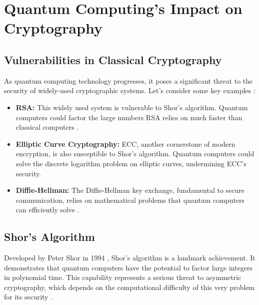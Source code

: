 \chapter{Quantum Computing's Impact on Cryptography}\label{chap:quantum_impact}

\section{Vulnerabilities in Classical Cryptography}

As quantum computing technology progresses, it poses a significant threat to the security of widely-used cryptographic systems.  Let's consider some key examples \parencite{shor1997polynomial,mosca2018cybersecurity}:

\begin{itemize}
    \item \textbf{RSA:}  This widely used system is vulnerable to Shor's algorithm. Quantum computers could factor the large numbers RSA relies on much faster than classical computers \parencite{rivest1978method}.
    \item \textbf{Elliptic Curve Cryptography:}  ECC, another cornerstone of modern encryption, is also susceptible to Shor's algorithm. Quantum computers could solve the discrete logarithm problem on elliptic curves, undermining ECC's security.
    \item \textbf{Diffie-Hellman:} The Diffie-Hellman key exchange, fundamental to secure communication, relies on mathematical problems that quantum computers can efficiently solve \parencite{diffie1976new}.
\end{itemize}


\section{Shor's Algorithm}\label{sec:shors_algorithm}

Developed by Peter Shor in 1994 \parencite{shor1994algorithms}, Shor's algorithm is a landmark achievement. It demonstrates that quantum computers have the potential to factor large integers in polynomial time. This capability represents a serious threat to asymmetric cryptography, which depends on the computational difficulty of this very problem for its security \parencite{beckman1996efficient}.

